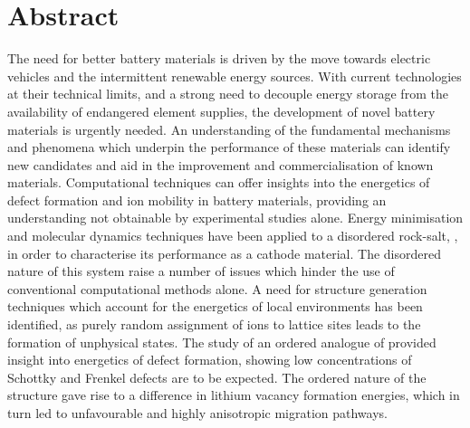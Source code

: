 \chapter*{Abstract}
The need for better battery materials is driven by the move towards electric vehicles and the intermittent renewable energy sources.
With current technologies at their technical limits, and a strong need to decouple energy storage from the availability of endangered element supplies, the development of novel battery materials is urgently needed.
An understanding of the fundamental mechanisms and phenomena which underpin the performance of these materials can identify new candidates and aid in the improvement and commercialisation of known materials.
Computational techniques can offer insights into the energetics of defect formation and ion mobility in battery materials, providing an understanding not obtainable by experimental studies alone.
Energy minimisation and molecular dynamics techniques have been applied to a disordered rock-salt, , in order to characterise its performance as a cathode material.
The disordered nature of this system raise a number of issues which hinder the use of conventional computational methods alone.
A need for structure generation techniques which account for the energetics of local environments has been identified, as purely random assignment of ions to lattice sites leads to the formation of unphysical states.
The study of an ordered analogue of  provided insight into energetics of defect formation, showing low concentrations of Schottky and Frenkel defects are to be expected.
The ordered nature of the structure gave rise to a difference in lithium vacancy formation energies, which in turn led to unfavourable and highly anisotropic migration pathways.
